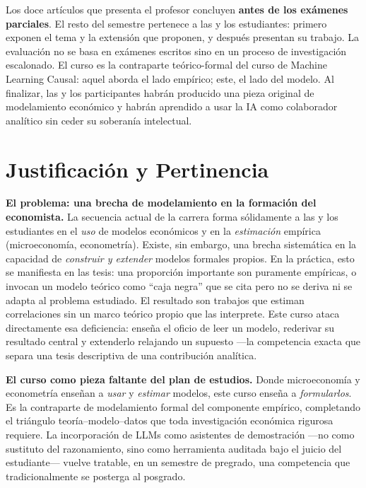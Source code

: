 \documentclass[11pt]{article}
\begin{document}
Los doce art\'iculos que presenta el profesor concluyen \textbf{antes de los ex\'amenes parciales}. El resto del semestre pertenece a las y los estudiantes: primero exponen el tema y la extensi\'on que proponen, y despu\'es presentan su trabajo. La evaluaci\'on no se basa en ex\'amenes escritos sino en un proceso de investigaci\'on escalonado. El curso es la contraparte te\'orico-formal del curso de Machine Learning Causal: aquel aborda el lado emp\'irico; este, el lado del modelo. Al finalizar, las y los participantes habr\'an producido una pieza original de modelamiento econ\'omico y habr\'an aprendido a usar la IA como colaborador anal\'itico sin ceder su soberan\'ia intelectual.

\section{Justificaci\'on y Pertinencia}

\textbf{El problema: una brecha de modelamiento en la formaci\'on del economista.}
La secuencia actual de la carrera forma s\'olidamente a las y los estudiantes en el \emph{uso} de modelos econ\'omicos y en la \emph{estimaci\'on} emp\'irica (microeconom\'ia, econometr\'ia). Existe, sin embargo, una brecha sistem\'atica en la capacidad de \emph{construir y extender} modelos formales propios. En la pr\'actica, esto se manifiesta en las tesis: una proporci\'on importante son puramente emp\'iricas, o invocan un modelo te\'orico como ``caja negra'' que se cita pero no se deriva ni se adapta al problema estudiado. El resultado son trabajos que estiman correlaciones sin un marco te\'orico propio que las interprete. Este curso ataca directamente esa deficiencia: ense\~na el oficio de leer un modelo, rederivar su resultado central y extenderlo relajando un supuesto ---la competencia exacta que separa una tesis descriptiva de una contribuci\'on anal\'itica.

\textbf{El curso como pieza faltante del plan de estudios.}
Donde microeconom\'ia y econometr\'ia ense\~nan a \emph{usar} y \emph{estimar} modelos, este curso ense\~na a \emph{formularlos}. Es la contraparte de modelamiento formal del componente emp\'irico, completando el tri\'angulo teor\'ia--modelo--datos que toda investigaci\'on econ\'omica rigurosa requiere. La incorporaci\'on de LLMs como asistentes de demostraci\'on ---no como sustituto del razonamiento, sino como herramienta auditada bajo el juicio del estudiante--- vuelve tratable, en un semestre de pregrado, una competencia que tradicionalmente se posterga al posgrado.
\end{document}
